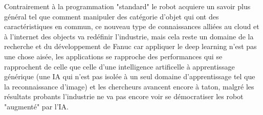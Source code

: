 Contrairement à la programmation "standard" le robot acquiere un savoir 
plus général tel que comment manipuler des catégorie d'objet qui ont 
des caractéristiques en commun, ce nouveau type de connaissances alliées au cloud 
et à l'internet des objects va redéfinir l'industrie, mais cela reste un domaine 
de la recherche et du développement de Fanuc car appliquer le deep learning 
n'est pas une chose aisée, les applications se rapproche des performances qui se rapprochent 
de celle que celle d'une intelligence artificelle à apprentissage générique (une 
IA qui n'est pas isolée à un seul domaine d'apprentissage tel que la reconnaissance d'image)
et les chercheurs avancent encore à taton, malgré les résultats probants 
l'industrie ne va pas encore voir se démocratiser les robot "augmenté" par l'IA. \newline
\newpage






